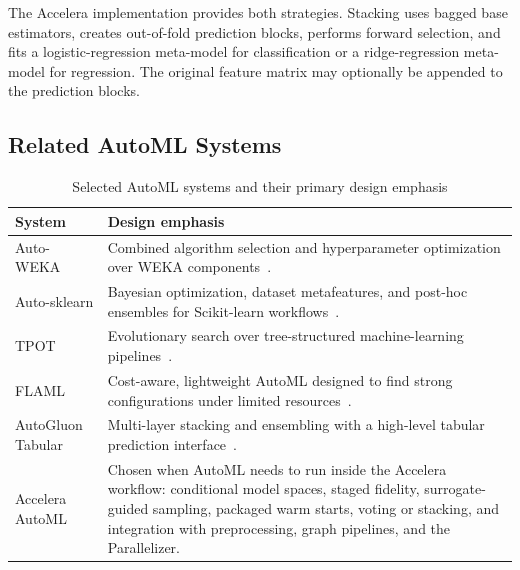 \documentclass[12pt,a4paper]{report}
\newcommand{\acceleraTableStyle}{%
\small
\renewcommand{\arraystretch}{1.15}
\setlength{\tabcolsep}{4pt}%
}
\begin{document}
\medskip
\noindent The Accelera implementation provides both strategies. Stacking uses
bagged base estimators, creates out-of-fold prediction blocks, performs forward
selection, and fits a logistic-regression meta-model for classification or a
ridge-regression meta-model for regression. The original feature matrix may
optionally be appended to the prediction blocks.

\subsection{Related AutoML Systems}

\begin{table}[H]
\centering
\acceleraTableStyle
\caption{Selected AutoML systems and their primary design emphasis}
\label{tab:automl_related_systems}
\begin{tabularx}{\textwidth}{>{\raggedright\arraybackslash}p{}X}
\toprule
\textbf{System} & \textbf{Design emphasis} \\
\midrule

Auto-WEKA &
Combined algorithm selection and hyperparameter optimization over WEKA
components~\cite{autoweka}. \\
\midrule

Auto-sklearn &
Bayesian optimization, dataset metafeatures, and post-hoc ensembles for
Scikit-learn workflows~\cite{autosklearn}. \\
\midrule

TPOT &
Evolutionary search over tree-structured machine-learning
pipelines~\cite{tpot}. \\
\midrule

FLAML &
Cost-aware, lightweight AutoML designed to find strong configurations under
limited resources~\cite{flaml}. \\
\midrule

AutoGluon Tabular &
Multi-layer stacking and ensembling with a high-level tabular prediction
interface~\cite{autogluon}. \\
\midrule

Accelera AutoML &
Chosen when AutoML needs to run inside the Accelera workflow: conditional model
spaces, staged fidelity, surrogate-guided sampling, packaged warm starts,
voting or stacking, and integration with preprocessing, graph pipelines, and
the Parallelizer. \\

\bottomrule
\end{tabularx}
\end{table}
\end{document}
